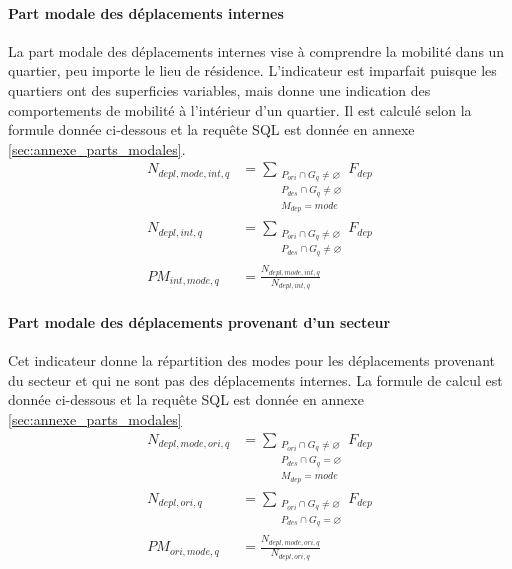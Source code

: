             \paragraph{Part modale des déplacements internes} La part modale des déplacements internes vise à comprendre la mobilité dans un quartier, peu importe le lieu de résidence. L'indicateur est imparfait puisque les quartiers ont des superficies variables, mais donne une indication des comportements de mobilité à l'intérieur d'un quartier. Il est calculé selon la formule donnée ci-dessous et la requête SQL est donnée en annexe \ref{sec:annexe_parts_modales}.
            \begin{align}
                N_{depl,mode,int,q} &= \sum_{\substack{P_{ori} \cap G_q \neq\varnothing\\ P_{des} \cap G_q\neq\varnothing \\ M_{dep}=mode}}{F_{dep}}  \\
                N_{depl,int,q} &= \sum_{\substack{P_{ori} \cap G_q \neq\varnothing\\ P_{des} \cap G_q \neq\varnothing}}{F_{dep}}  \\
                PM_{int,mode,q} &= \frac{N_{depl,mode,int,q}}{N_{depl,int,q}} \label{eq:pm-int}
            \end{align}
            \paragraph{Part modale des déplacements provenant d'un secteur} Cet indicateur donne la répartition des modes pour les déplacements provenant du secteur et qui ne sont pas des déplacements internes. La formule de calcul est donnée ci-dessous et la requête SQL est donnée en annexe \ref{sec:annexe_parts_modales}
            \begin{align}
                N_{depl,mode,ori,q} &= \sum_{\substack{P_{ori} \cap G_q\neq\varnothing \\ P_{des} \cap G_q=\varnothing \\ M_{dep}=mode}}{F_{dep}}  \\
                N_{depl,ori,q} &= \sum_{\substack{P_{ori} \cap G_q\neq\varnothing \\ P_{des} \cap G_q=\varnothing}}{F_{dep}} \\
                PM_{ori,mode,q} &= \frac{N_{depl,mode,ori,q}}{N_{depl,ori,q}} \label{eq:pm-ori}
            \end{align}
